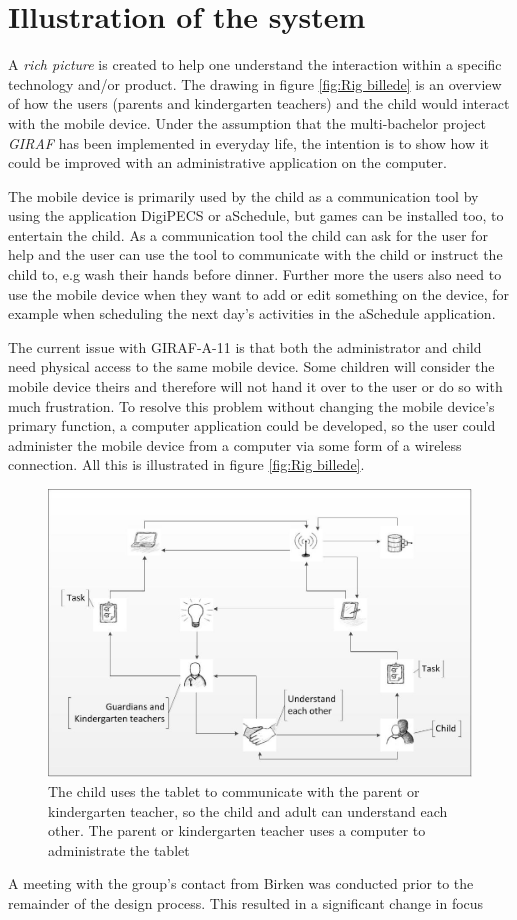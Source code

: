 \section{Illustration of the system}
A \emph{rich picture} is created to help one understand the interaction within a specific technology and/or product\cite{OOAD}. The drawing in figure \vref{fig:Rig billede} is an overview of how the users (parents and kindergarten teachers) and the child would interact with the mobile device. Under the assumption that the multi-bachelor project \emph{GIRAF} has been implemented in everyday life, the intention is to show how it could be improved with an administrative application on the computer.

The mobile device is primarily used by the child as a communication tool by using the application DigiPECS or aSchedule, but games can be installed too, to entertain the child. As a communication tool the child can ask for the user for help and the user can use the tool to communicate with the child or instruct the child to, e.g wash their hands before dinner.
Further more the users also need to use the mobile device when they want to add or edit something on the device, for example when scheduling the next day's activities in the aSchedule application.
 
The current issue with GIRAF-A-11 is that both the administrator and child need physical access to the same mobile device. Some children will consider the mobile device theirs and therefore will not hand it over to the user or do so with much frustration. To resolve this problem without changing the mobile device's primary function, a computer application could be developed, so the user could administer the mobile device from a computer via some form of a wireless connection. All this is illustrated in figure \vref{fig:Rig billede}. 

\begin{figure}[!ht]
	\centering
		\includegraphics[width=1.00\textwidth]{img/Rig_billede2.jpg}
	\caption{The child uses the tablet to communicate with the parent or kindergarten teacher, so the child and adult can understand each other. The parent or kindergarten teacher uses a computer to administrate the tablet}
	\label{fig:Rig billede}
\end{figure}
\newpage

A meeting with the group's contact from Birken was conducted prior to the remainder of the design process. This resulted in a significant change in focus
    